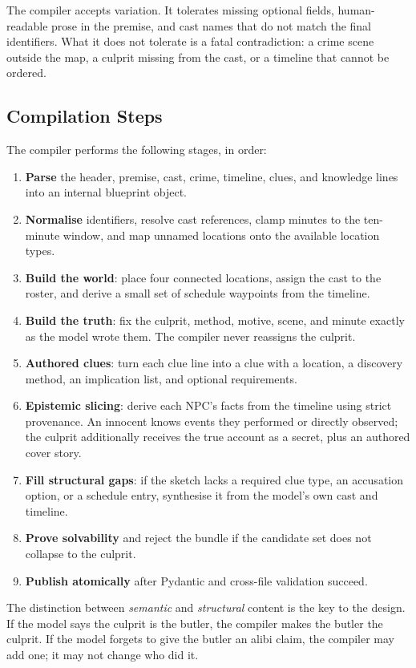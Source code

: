 ﻿\documentclass[11pt,a4paper]{report}
\begin{document}
The compiler accepts variation. It tolerates missing optional fields, human-readable prose in the premise, and cast names that do not match the final identifiers. What it does not tolerate is a fatal contradiction: a crime scene outside the map, a culprit missing from the cast, or a timeline that cannot be ordered.

\subsection{Compilation Steps}
The compiler performs the following stages, in order:

\begin{enumerate}
  \item \textbf{Parse} the header, premise, cast, crime, timeline, clues, and knowledge lines into an internal blueprint object.
  \item \textbf{Normalise} identifiers, resolve cast references, clamp minutes to the ten-minute window, and map unnamed locations onto the available location types.
  \item \textbf{Build the world}: place four connected locations, assign the cast to the roster, and derive a small set of schedule waypoints from the timeline.
  \item \textbf{Build the truth}: fix the culprit, method, motive, scene, and minute exactly as the model wrote them. The compiler never reassigns the culprit.
  \item \textbf{Authored clues}: turn each clue line into a clue with a location, a discovery method, an implication list, and optional requirements.
  \item \textbf{Epistemic slicing}: derive each NPC's facts from the timeline using strict provenance. An innocent knows events they performed or directly observed; the culprit additionally receives the true account as a secret, plus an authored cover story.
  \item \textbf{Fill structural gaps}: if the sketch lacks a required clue type, an accusation option, or a schedule entry, synthesise it from the model's own cast and timeline.
  \item \textbf{Prove solvability} and reject the bundle if the candidate set does not collapse to the culprit.
  \item \textbf{Publish atomically} after Pydantic and cross-file validation succeed.
\end{enumerate}

The distinction between \emph{semantic} and \emph{structural} content is the key to the design. If the model says the culprit is the butler, the compiler makes the butler the culprit. If the model forgets to give the butler an alibi claim, the compiler may add one; it may not change who did it.
\end{document}
